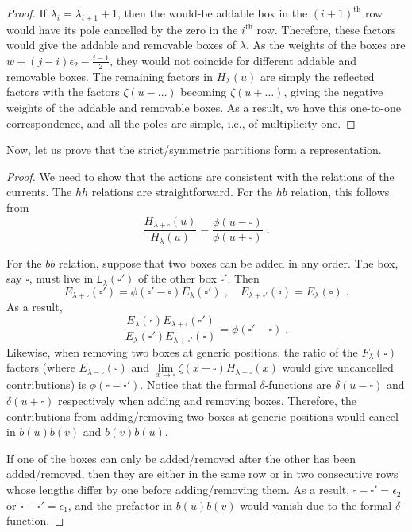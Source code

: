 \documentclass[11pt]{article}
\numberwithin{equation}{section}
\numberwithin{figure}{section}
\numberwithin{table}{section}
\begin{document}
\begin{proof}
	If $\lambda_i=\lambda_{i+1}+1$, then the would-be addable box in the $(i+1)^\text{th}$ row would have its pole cancelled by the zero in the $i^\text{th}$ row. Therefore, these factors would give the addable and removable boxes of $\lambda$. As the weights of the boxes are $w+(j-i)\epsilon_2-\frac{i-1}{2}$, they would not coincide for different addable and removable boxes. The remaining factors in $H_\lambda(u)$ are simply the reflected factors with the factors $\zeta(u-\dots)$ becoming $\zeta(u+\dots)$, giving the negative weights of the addable and removable boxes. As a result, we have this one-to-one correspondence, and all the poles are simple, i.e., of multiplicity one.
\end{proof}

Now, let us prove that the strict/symmetric partitions form a representation.
\begin{proof}
	We need to show that the actions are consistent with the relations of the currents. The $hh$ relations are straightforward. For the $hb$ relation, this follows from
	\begin{equation}
		\frac{H_{\lambda+\square}(u)}{H_\lambda(u)}=\frac{\phi(u-\square)}{\phi(u+\square)}\;.
	\end{equation}

	For the $bb$ relation, suppose that two boxes can be added in any order. The box, say $\square$, must live in $\mathtt{L}_\lambda(\square')$ of the other box $\square'$. Then
	\begin{equation}
		E_{\lambda+\square}(\square')=\phi(\square'-\square)E_\lambda(\square')\;,\quad E_{\lambda+\square'}(\square)=E_\lambda(\square)\;.
	\end{equation}
	As a result,
	\begin{equation}
		\frac{E_\lambda(\square)E_{\lambda+\square}(\square')}{E_\lambda(\square')E_{\lambda+\square'}(\square)}=\phi(\square'-\square)\;.
	\end{equation}
	Likewise, when removing two boxes at generic positions, the ratio of the $F_\lambda(\square)$ factors (where $E_{\lambda-\square}(\square)$ and $\lim\limits_{x\rightarrow\square}\zeta(x-\square)H_{\lambda-\square}(x)$ would give uncancelled contributions) is $\phi(\square-\square')$. Notice that the formal $\delta$-functions are $\delta(u-\square)$ and $\delta(u+\square)$ respectively when adding and removing boxes. Therefore, the contributions from adding/removing two boxes at generic positions would cancel in $b(u)b(v)$ and $b(v)b(u)$.

	If one of the boxes can only be added/removed after the other has been added/removed, then they are either in the same row or in two consecutive rows whose lengths differ by one before adding/removing them. As a result, $\square-\square'=\epsilon_2$ or $\square-\square'=\epsilon_1$, and the prefactor in $b(u)b(v)$ would vanish due to the formal $\delta$-function.


\end{proof}
\end{document}
